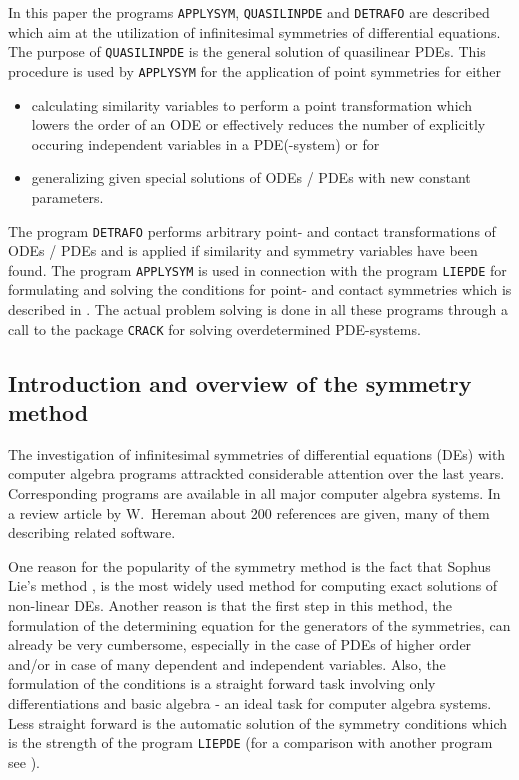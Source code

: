 
In this paper the programs \texttt{APPLYSYM}, \texttt{QUASILINPDE} and
\texttt{DETRAFO} are described which aim at the utilization
of infinitesimal symmetries of differential equations. The purpose
of \texttt{QUASILINPDE} is the general solution of
quasilinear PDEs. This procedure is used by \texttt{APPLYSYM}
for the application of point symmetries for either
\begin{itemize}
\item calculating similarity variables to perform a point transformation
which lowers the order of an ODE or effectively reduces the number of
explicitly occuring independent variables in a PDE(-system) or for
\item generalizing given special solutions of ODEs / PDEs with new constant
parameters.
\end{itemize}

The program \texttt{DETRAFO} performs arbitrary point- and contact
transformations of ODEs / PDEs and is applied if similarity
and symmetry variables have been found.
The program \texttt{APPLYSYM} is used in connection with the program
\texttt{LIEPDE} for formulating and solving the conditions for point- and
contact symmetries which is described in \cite{LIEPDE}.
The actual problem solving is done in all these programs through a call
to the package \texttt{CRACK} for solving overdetermined PDE-systems.

\subsection{Introduction and overview of the symmetry method}
The investigation of infinitesimal symmetries of differential equations
(DEs) with computer algebra programs attrackted considerable attention
over the last years. Corresponding programs are available in all
major computer algebra systems. In a review article by W.\ Hereman
\cite{WHer} about 200 references are given, many of them describing related
software.

One reason for the popularity of the symmetry method
is the fact that Sophus Lie's method
\cite{lie1},\cite{lie2} is the most widely
used method for computing exact solutions of non-linear DEs. Another reason is
that the first step in this
method, the formulation of the determining equation for the generators
of the symmetries, can already be very cumbersome, especially in the
case of PDEs of higher order and/or in case of many dependent and independent
variables. Also, the formulation of the conditions is a straight forward
task involving only differentiations and basic algebra - an ideal task for
computer algebra systems. Less straight forward is the automatic solution
of the symmetry conditions which is the strength of the program \texttt{LIEPDE}
(for a comparison with another program see \cite{LIEPDE}).

